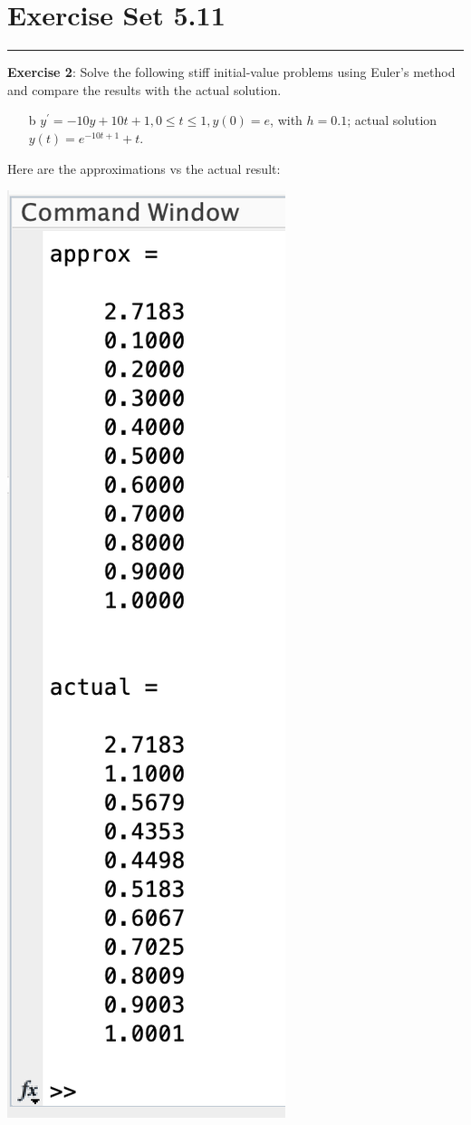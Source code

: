 \documentclass{article}
\begin{document}
\newpage
\section*{Exercise Set 5.11}
\hrule

\textbf{Exercise 2}: Solve the following stiff initial-value problems using Euler's method and compare the results with the actual solution.
    \begin{itemize}
        \item [b] $y^{\prime} = -10y + 10t + 1, 0 \leq t \leq 1, y(0) = e$, with $h  = 0.1$; actual solution $y(t) = e^{-10t + 1} + t$.
    \end{itemize}
    \begin{answer}
        Here are the approximations vs the actual result:
        \begin{center}
            \includegraphics[scale=0.5]{q5}

\end{center}
\end{answer}
\end{document}
